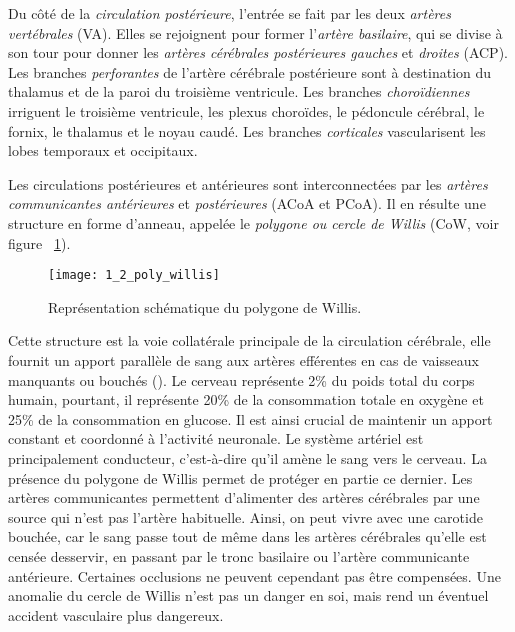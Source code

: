 Du côté de la {\em circulation postérieure}, l’entrée se fait par les deux {\em artères vertébrales} (VA). Elles se rejoignent pour former l’{\em artère basilaire}, qui se divise à son tour pour donner les {\em artères cérébrales postérieures gauches} et {\em droites} (ACP). Les branches {\em perforantes} de l'artère cérébrale postérieure sont à destination du thalamus et de la paroi du troisième ventricule. Les branches {\em choroïdiennes} irriguent le troisième ventricule, les plexus choroïdes, le pédoncule cérébral, le fornix, le thalamus et le noyau caudé. Les branches {\em corticales} vascularisent les lobes temporaux et occipitaux.

Les circulations postérieures et antérieures sont interconnectées par les {\em artères communicantes antérieures} et {\em postérieures} (ACoA et PCoA). Il en résulte une structure en forme d’anneau, appelée le {\em polygone ou cercle de Willis} (CoW, voir figure ~\ref{fig:1_2_poly_willis}).
\begin{figure}[!t]
\centering
\texttt{[image: 1\_2\_poly\_willis]}
\caption{Représentation schématique du polygone de Willis. }
\label{fig:1_2_poly_willis}	
\end{figure}
Cette structure est la voie collatérale principale de la circulation cérébrale, elle fournit un apport parallèle de sang aux artères efférentes en cas de vaisseaux manquants ou bouchés (\cite{Alastruey2007}). Le cerveau représente 2\% du poids total du corps humain, pourtant, il représente 20\% de la consommation totale en oxygène et 25\% de la consommation en glucose. Il est ainsi crucial de maintenir un apport constant et coordonné à l’activité neuronale. Le système artériel est principalement conducteur, c’est-à-dire qu’il amène le sang vers le cerveau. La présence du polygone de Willis permet de protéger en partie ce dernier. Les artères communicantes permettent d'alimenter des artères cérébrales par une source qui n'est pas l'artère habituelle. Ainsi, on peut vivre avec une carotide bouchée, car le sang passe tout de même dans les artères cérébrales qu'elle est censée desservir, en passant par le tronc basilaire ou l'artère communicante antérieure. Certaines occlusions ne peuvent cependant pas être compensées. Une anomalie du cercle de Willis n'est pas un danger en soi, mais rend un éventuel accident vasculaire plus dangereux.

